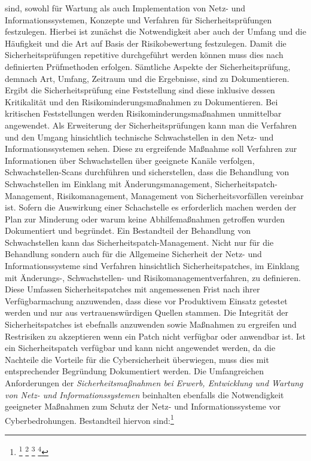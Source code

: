 \documentclass[11pt,a4paper,hidelinks]{article}   %
\begin{document}
sind, sowohl für Wartung als auch Implementation von Netz- und Informationssystemen, Konzepte und Verfahren für Sicherheitsprüfungen festzulegen. Hierbei ist zunächst die Notwendigkeit aber auch der Umfang und die Häufigkeit und die Art auf Basis der Risikobewertung festzulegen. Damit die Sicherheitsprüfungen repetitive durchgeführt werden können muss dies nach definierten Prüfmethoden erfolgen. Sämtliche Aspekte der Sicherheitsprüfung, demnach Art, Umfang, Zeitraum und die Ergebnisse, sind zu Dokumentieren. Ergibt die Sicherheitsprüfung eine Feststellung sind diese inklusive dessen Kritikalität und den Risikominderungsmaßnahmen zu Dokumentieren. Bei kritischen Feststellungen werden Risikominderungsmaßnahmen unmittelbar angewendet. Als Erweiterung der Sicherheitsprüfungen kann man die Verfahren und den Umgang hinsichtlich technische Schwachstellen in den Netz- und Informationssystemen sehen. Diese zu ergreifende Maßnahme soll Verfahren zur Informationen über Schwachstellen über geeignete Kanäle verfolgen, Schwachstellen-Scans durchführen und sicherstellen, dass die Behandlung von Schwachstellen im Einklang mit Änderungsmanagement, Sicherheitspatch-Management, Risikomanagement, Management von Sicherheitsvorfällen vereinbar ist. Sofern die Auswirkung einer Schachstelle es erforderlich machen werden der Plan zur Minderung oder warum keine Abhilfemaßnahmen getroffen wurden Dokumentiert und begründet. Ein Bestandteil der Behandlung von Schwachstellen kann das Sicherheitspatch-Management. Nicht nur für die Behandlung sondern auch für die Allgemeine Sicherheit der Netz- und Informationssysteme sind Verfahren hinsichtlich Sicherheitspatches, im Einklang mit Änderungs-,  Schwachstellen-  und Risikomanagementverfahren, zu definieren. Diese Umfassen Sicherheitspatches mit angemessenen Frist nach ihrer Verfügbarmachung anzuwenden, dass diese vor Produktivem Einsatz getestet werden und nur aus vertrauenswürdigen Quellen stammen. Die Integrität der Sicherheitspatches ist ebefnalls anzuwenden sowie Maßnahmen zu ergreifen und Restrisiken zu akzeptieren wenn ein Patch nicht verfügbar oder anwendbar ist. Ist ein Sicherheitspatch verfügbar und kann nicht angewendet werden, da die Nachteile die Vorteile für die Cybersicherheit überwiegen, muss dies mit entsprechender Begründung Dokumentiert werden. Die Umfangreichen Anforderungen der \emph{Sicherheitsmaßnahmen bei Erwerb, Entwicklung und Wartung von Netz- und Informationssystemen} beinhalten ebenfalls die Notwendigkeit geeigneter Maßnahmen zum Schutz der Netz- und Informationssysteme vor Cyberbedrohungen. Bestandteil hiervon sind:\footnote{
                \footcite[Vgl. Nummer 6 bis 6.6.2 \& 6.10,][, Anhang]{EU2024-2690}
                \footcite[Vgl. §3, Absatz 1, Nummer 2,][]{NIS2UmsuCG} %
                \footcite[Vgl. §13, Absatz 1,][]{NIS2UmsuCG} %
                \footcite[Vgl. §30 Absatz 2, Nummer 5,][]{NIS2UmsuCG} %
            }
\end{document}
